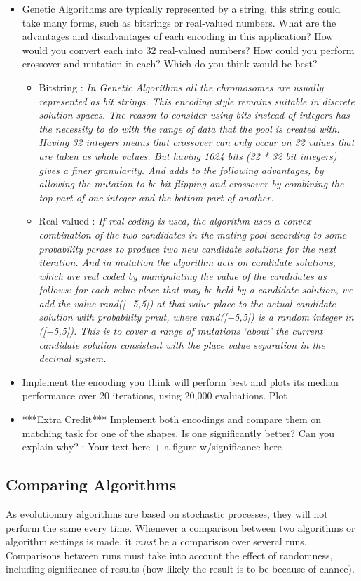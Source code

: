 \documentclass{article}
\begin{document}
\begin{itemize}
\item Genetic Algorithms are typically represented by a string, this string could take many forms, such as bitsrings or real-valued numbers. What are the advantages and disadvantages of each encoding in this application? How would you convert each into 32 real-valued numbers? How could you perform crossover and mutation in each? Which do you think would be best?
\begin{itemize}
\item Bitstring : \color{blue}\textit{In Genetic Algorithms all the chromosomes are usually represented as bit strings. This encoding style remains suitable in discrete solution spaces. The reason to consider using bits instead of integers has the necessity to do with the range of data that the pool is created with. Having 32 integers means that crossover can only occur on 32 values that are taken as whole values. But having 1024 bits (32 * 32 bit integers) gives a finer granularity. And adds to the following advantages, by allowing the mutation to be bit flipping and crossover by combining the top part of one integer and the bottom part of another.}
\item \color{black}Real-valued : \color{blue}\textit{If real coding is used, the algorithm uses a convex combination of the two candidates in the mating pool according to some probability pcross to produce two new candidate solutions for the next iteration. And in mutation the algorithm acts on candidate solutions, which are real coded by manipulating the value of the candidates as follows: for each
value place that may be held by a candidate solution, we add the value rand([−5,5]) at  that  value  place  to  the  actual  candidate  solution  with probability pmut, where rand([−5,5]) is a random integer in ([−5,5]). This is to cover a range of mutations ‘about’ the  current candidate  solution  consistent  with  the  place value separation in the decimal system.}
\end{itemize}
\item Implement the encoding you think will perform best and plots its median performance over 20 iterations, using 20,000 evaluations.
\color{red} Plot
\item ***Extra Credit*** Implement both encodings and compare them on
matching task for one of the shapes. Is one significantly better? Can
you explain why? : \color{red} Your text here + a figure w/significance here
\end{itemize}
\subsection*{Comparing Algorithms}
As evolutionary algorithms are based on stochastic processes, they will not perform the same every time. Whenever a comparison between two algorithms or algorithm settings is made, it \emph{must} be a comparison over several runs. Comparisons between runs must take into account the effect of randomness, including significance of results (how likely the result is to be because of chance).
\end{document}

